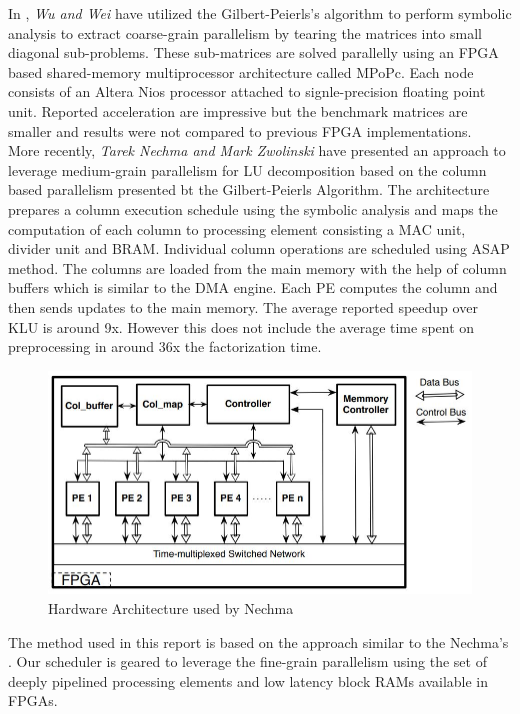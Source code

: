 In \cite{WuWei}, \textit{Wu and Wei} have utilized the Gilbert-Peierls's algorithm 
to perform symbolic analysis to extract coarse-grain parallelism 
by tearing the matrices into small diagonal sub-problems. These sub-matrices are 
solved parallelly using an FPGA based shared-memory multiprocessor architecture 
called MPoPc. Each node consists of an Altera Nios processor attached to signle-precision
floating point unit.  Reported acceleration are impressive but the benchmark matrices 
are smaller and results were not compared to 
previous FPGA implementations. \\
More recently, \textit{Tarek Nechma and Mark Zwolinski} \cite{Nechma} have presented an approach to 
leverage medium-grain parallelism for LU decomposition based on the column
based parallelism presented bt the Gilbert-Peierls Algorithm. The architecture 
prepares a column execution schedule using the symbolic analysis and maps the
computation of each column to processing element consisting a MAC unit, divider unit
and BRAM. Individual column operations are scheduled using ASAP method. The columns 
are loaded from the main memory with the help of column buffers which is similar to
the DMA engine. Each PE computes the column and then sends updates to the main memory. 
The average reported speedup over KLU is around 9x. However this does not include 
the average time spent on preprocessing in around 36x the factorization time.


\begin{figure}
    \centering
    \includegraphics[width = 0.9\linewidth]{./ReviewLit/nechmasArchitecture.JPG}
    \caption{Hardware Architecture used by Nechma \cite{Nechma}}
    \label{fig:Intro:nechma}
\end{figure}


The method used in this report is based on the approach similar to the Nechma's \cite{Nechma}. 
Our scheduler is geared to leverage the fine-grain parallelism using the set of 
deeply pipelined processing elements and low latency block RAMs available in FPGAs. 